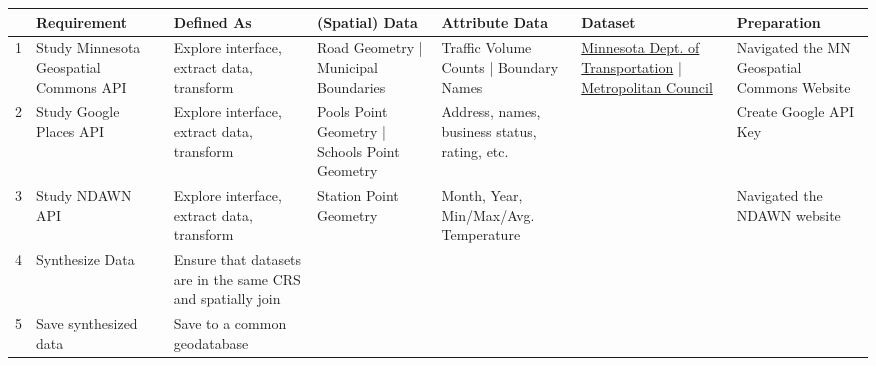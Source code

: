 \documentclass[article,12pt]{article}
\numberwithin{equation}{section}
\begin{document}
{
	\scriptsize
	\begin{tabular}{|l|p{.12\linewidth}|p{.2\linewidth}|p{.2\linewidth}|p{.1\linewidth}|p{.1\linewidth}|p{.1\linewidth}|}
	\hline	& \textbf{Requirement} & \textbf{Defined As} & \textbf{(Spatial) Data} & \textbf{Attribute Data} & \textbf{Dataset} & \textbf{Preparation} \\ \hline
		1 &  Study Minnesota Geospatial Commons API       &    Explore interface, extract data, transform                                                            & Road Geometry | Municipal Boundaries         &   Traffic Volume Counts | Boundary Names                                               & \href{https://gisdata.mn.gov/dataset/trans-aadt-traffic-segments}{Minnesota Dept. of Transportation} | \href{https://gisdata.mn.gov/dataset/us-mn-state-metc-bdry-census2010counties-ctus}{Metropolitan Council}                                                                                                                &       Navigated the MN Geospatial Commons Website \\ \hline
		2 &  Study Google Places API       &    Explore interface, extract data, transform                                                            & Pools Point Geometry | Schools Point Geometry         &   Address, names, business status, rating, etc.                                   &                                                                                                               & Create Google API Key  \\ \hline
		3 &  Study NDAWN API       &    Explore interface, extract data, transform                                                            & Station Point Geometry         &  Month, Year, Min/Max/Avg. Temperature                                               &                                                                                                                &       Navigated the NDAWN website \\ \hline
		4 & Synthesize Data                            & Ensure that datasets are in the same CRS and spatially join &                   &                                                   &                                                                                                                                           &             \\ \hline
		5 & Save synthesized data & Save to a common geodatabase                &                                         &                                                   &                                                                                                                                                                                                         &             \\ \hline     
	\end{tabular}
}
\end{document}
